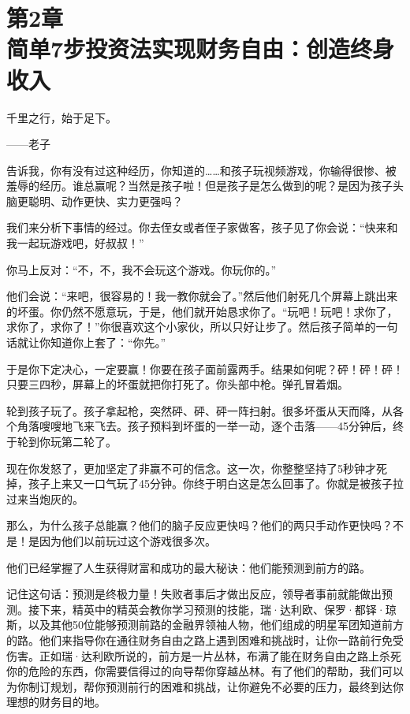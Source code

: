 
\section[第2章\q 简单7步投资法实现财务自由：创造终身收入]{第2章\\ 简单7步投资法实现财务自由：创造终身收入}

\begin{BookQuote}
千里之行，始于足下。

\hfill ——老子
\end{BookQuote}

告诉我，你有没有过这种经历，你知道的……和孩子玩视频游戏，你输得很惨、被羞辱的经历。谁总赢呢？当然是孩子啦！但是孩子是怎么做到的呢？是因为孩子头脑更聪明、动作更快、实力更强吗？

我们来分析下事情的经过。你去侄女或者侄子家做客，孩子见了你会说：“快来和我一起玩游戏吧，好叔叔！”

你马上反对：“不，不，我不会玩这个游戏。你玩你的。”

他们会说：“来吧，很容易的！我一教你就会了。”然后他们射死几个屏幕上跳出来的坏蛋。你仍然不愿意玩，于是，他们就开始恳求你了。“玩吧！玩吧！求你了，求你了，求你了！”你很喜欢这个小家伙，所以只好让步了。然后孩子简单的一句话就让你知道你上套了：“你先。”

于是你下定决心，一定要赢！你要在孩子面前露两手。结果如何呢？砰！砰！砰！只要三四秒，屏幕上的坏蛋就把你打死了。你头部中枪。弹孔冒着烟。

轮到孩子玩了。孩子拿起枪，突然砰、砰、砰一阵扫射。很多坏蛋从天而降，从各个角落嗖嗖地飞来飞去。孩子预料到坏蛋的一举一动，逐个击落——45分钟后，终于轮到你玩第二轮了。

现在你发怒了，更加坚定了非赢不可的信念。这一次，你整整坚持了5秒钟才死掉，孩子上来又一口气玩了45分钟。你终于明白这是怎么回事了。你就是被孩子拉过来当炮灰的。

那么，为什么孩子总能赢？他们的脑子反应更快吗？他们的两只手动作更快吗？不是！是因为他们以前玩过这个游戏很多次。

他们已经掌握了人生获得财富和成功的最大秘诀：他们能预测到前方的路。

记住这句话：预测是终极力量！失败者事后才做出反应，领导者事前就能做出预测。接下来，精英中的精英会教你学习预测的技能，瑞·达利欧、保罗·都铎·琼斯，以及其他50位能够预测前路的金融界领袖人物，他们组成的明星军团知道前方的路。他们来指导你在通往财务自由之路上遇到困难和挑战时，让你一路前行免受伤害。正如瑞·达利欧所说的，前方是一片丛林，布满了能在财务自由之路上杀死你的危险的东西，你需要信得过的向导帮你穿越丛林。有了他们的帮助，我们可以为你制订规划，帮你预测前行的困难和挑战，让你避免不必要的压力，最终到达你理想的财务目的地。

